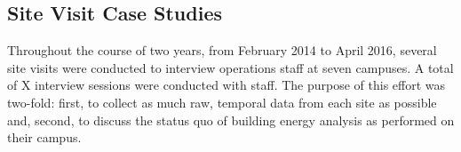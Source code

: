 \subsection{Site Visit Case Studies}
\label{sec:sitevisit}
Throughout the course of two years, from February 2014 to April 2016, several site visits were conducted to interview operations staff at seven campuses. A total of X interview sessions were conducted with staff. The purpose of this effort was two-fold: first, to collect as much raw, temporal data from each site as possible and, second, to discuss the status quo of building energy analysis as performed on their campus.
